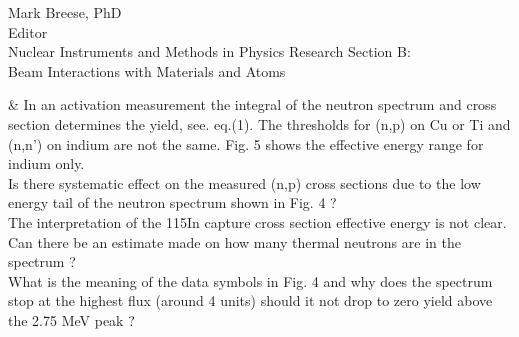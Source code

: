 \documentclass{letter} %
\begin{document}
\begin{letter}{Mark Breese, PhD \\
Editor \\
Nuclear Instruments and Methods in Physics Research Section B: \\
Beam Interactions with Materials and Atoms}
\begin{easylist}[enumerate]
& In an activation measurement the integral of the neutron spectrum and cross section determines the yield, see. eq.(1).
The thresholds for (n,p) on Cu or Ti and (n,n') on indium are not the same. Fig. 5 shows the effective energy range for indium only.\\ Is there systematic effect on the measured (n,p) cross sections due to the low energy tail of the neutron spectrum shown in Fig. 4 ?\\
The interpretation of the 115In capture cross section effective energy is not clear. \\ Can there be an estimate made on how many thermal neutrons are in the spectrum ?\\
What is the meaning of the data symbols in Fig. 4  and why does the spectrum stop at the
highest flux (around 4 units) should it not drop to zero yield above the 2.75 MeV peak ?

\end{easylist}
\end{letter}
\end{document}
